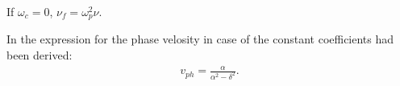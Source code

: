 \documentclass[a4paper,10pt]{article}
\begin{document}
If $\omega_c=0$, $\nu_f=\omega_p^2\nu$.














In \cite{} the expression for the phase velosity in case of the constant coefficients had been derived:
\begin{align*}
 v_{ph}=\frac{\alpha}{\alpha^2-\delta^2}.
\end{align*}
\end{document}
